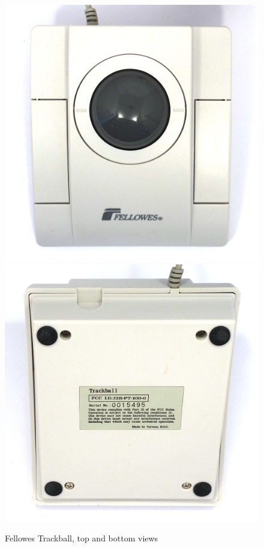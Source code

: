 \documentclass[11pt, a4paper]{article}
\begin{document}
\begin{figure}[h]
    \centering
    \includegraphics[scale=0.45]{1997_fellowes_trackball/top_60.jpg}
    \includegraphics[scale=0.45]{1997_fellowes_trackball/bottom_60.jpg}
    \caption{Fellowes Trackball, top and bottom views}
    \label{fig:FellowesTrackballTopBottom}
\end{figure}
\end{document}
